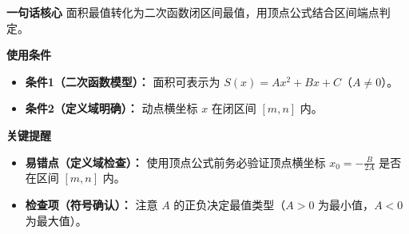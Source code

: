 \begin{summarybox}
	\textbf{\textcolor{CSummary}{一句话核心}}
	面积最值转化为二次函数闭区间最值，用顶点公式结合区间端点判定。

	\medskip
	\textbf{\textcolor{CSummary}{使用条件}}
	\begin{itemize}[leftmargin=*, itemsep=0.5em, topsep=0.4em]
		\item \textbf{条件1（二次函数模型）：} 面积可表示为 $S(x)=Ax^{2}+Bx+C$（$A\neq0$）。
		\item \textbf{条件2（定义域明确）：} 动点横坐标 $x$ 在闭区间 $[m,n]$ 内。
	\end{itemize}

	\medskip
	\textbf{\textcolor{CSummary}{关键提醒}}
	\begin{itemize}[leftmargin=*, itemsep=0.5em, topsep=0.4em]
		\item \textbf{易错点（定义域检查）：} 使用顶点公式前务必验证顶点横坐标 $x_{0}=-\frac{B}{2A}$ 是否在区间 $[m,n]$ 内。
		\item \textbf{检查项（符号确认）：} 注意 $A$ 的正负决定最值类型（$A>0$ 为最小值，$A<0$ 为最大值）。
	\end{itemize}

\end{summarybox}
